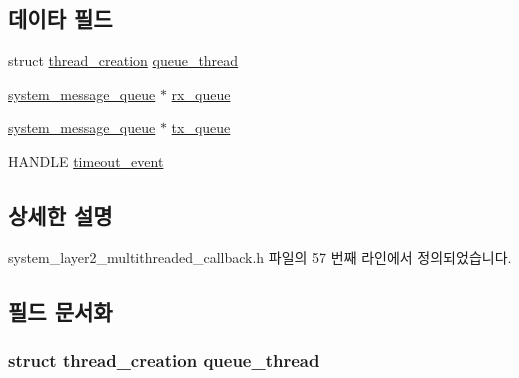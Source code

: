 \subsection*{데이타 필드}
\begin{DoxyCompactItemize}
\item 
struct \hyperlink{structavdecc__lib_1_1system__layer2__multithreaded__callback_1_1thread__creation}{thread\+\_\+creation} \hyperlink{structavdecc__lib_1_1system__layer2__multithreaded__callback_1_1msg__poll_ac6b3d0d85780440938e33c8603a068a5}{queue\+\_\+thread}
\item 
\hyperlink{classavdecc__lib_1_1system__message__queue}{system\+\_\+message\+\_\+queue} $\ast$ \hyperlink{structavdecc__lib_1_1system__layer2__multithreaded__callback_1_1msg__poll_a93c2870712cbf709f0eca144e08787bc}{rx\+\_\+queue}
\item 
\hyperlink{classavdecc__lib_1_1system__message__queue}{system\+\_\+message\+\_\+queue} $\ast$ \hyperlink{structavdecc__lib_1_1system__layer2__multithreaded__callback_1_1msg__poll_af328d89cdcae8c180cbfcff63c8712fd}{tx\+\_\+queue}
\item 
H\+A\+N\+D\+LE \hyperlink{structavdecc__lib_1_1system__layer2__multithreaded__callback_1_1msg__poll_a68812fe43e8aedd54c9c7602e60827d9}{timeout\+\_\+event}
\end{DoxyCompactItemize}


\subsection{상세한 설명}


system\+\_\+layer2\+\_\+multithreaded\+\_\+callback.\+h 파일의 57 번째 라인에서 정의되었습니다.



\subsection{필드 문서화}
\subsubsection[{\texorpdfstring{queue\+\_\+thread}{queue_thread}}]{\setlength{\rightskip}{0pt plus 5cm}struct {\bf thread\+\_\+creation} queue\+\_\+thread}\hypertarget{structavdecc__lib_1_1system__layer2__multithreaded__callback_1_1msg__poll_ac6b3d0d85780440938e33c8603a068a5}{}\label{structavdecc__lib_1_1system__layer2__multithreaded__callback_1_1msg__poll_ac6b3d0d85780440938e33c8603a068a5}


